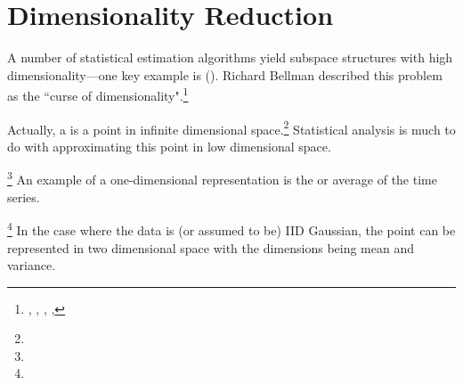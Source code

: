\chapter{Dimensionality Reduction}
\label{chp:dimreduct}
A number of statistical estimation algorithms yield subspace structures with 
high dimensionality---one key example is  ().
Richard Bellman described this problem as the 
``curse of dimensionality".\footnote{
  ,
  ,
  ,
  ,
  }

Actually, a  is a point in infinite dimensional space.\footnote{
  }
Statistical analysis is much to do with approximating this point in low dimensional space.

\begin{example}
\footnote{
  }
An example of a one-dimensional representation is the  or average of the time series.
\end{example}

\begin{example}
\footnote{
  }
In the case where the data is (or assumed to be) IID Gaussian, the point can be represented in 
two dimensional space with the dimensions being mean and variance.
\end{example}

